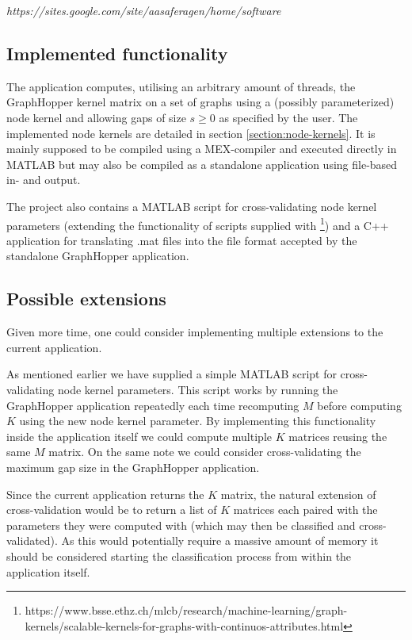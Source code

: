 \documentclass{article}
\begin{document}
\textit{https://sites.google.com/site/aasaferagen/home/software} 

\subsection{Implemented functionality}
The application computes, utilising an arbitrary amount of threads, the GraphHopper kernel matrix on a set of graphs using a (possibly parameterized) node kernel and allowing gaps of size $s\geq 0$ as specified by the user. The implemented node kernels are detailed in section \ref{section:node-kernels}. It is mainly supposed to be compiled using a MEX-compiler and executed directly in MATLAB but may also be compiled as a standalone application using file-based in- and output.

The project also contains a MATLAB script for cross-validating node kernel parameters (extending the functionality of scripts supplied with \cite{graphhopper}\footnote{https://www.bsse.ethz.ch/mlcb/research/machine-learning/graph-kernels/scalable-kernels-for-graphs-with-continuos-attributes.html}) and a C++ application for translating .mat files into the file format accepted by the standalone GraphHopper application.

\subsection{Possible extensions}
Given more time, one could consider implementing multiple extensions to the current application.

As mentioned earlier we have supplied a simple MATLAB script for cross-validating node kernel parameters. This script works by running the GraphHopper application repeatedly each time recomputing $M$ before computing $K$ using the new node kernel parameter. By implementing this functionality inside the application itself we could compute multiple $K$ matrices reusing the same $M$ matrix. On the same note we could consider cross-validating the maximum gap size in the GraphHopper application.

Since the current application returns the $K$ matrix, the natural extension of cross-validation would be to return a list of $K$ matrices each paired with the parameters they were computed with (which may then be classified and cross-validated). As this would potentially require a massive amount of memory it should be considered starting the classification process from within the application itself.
\end{document}
